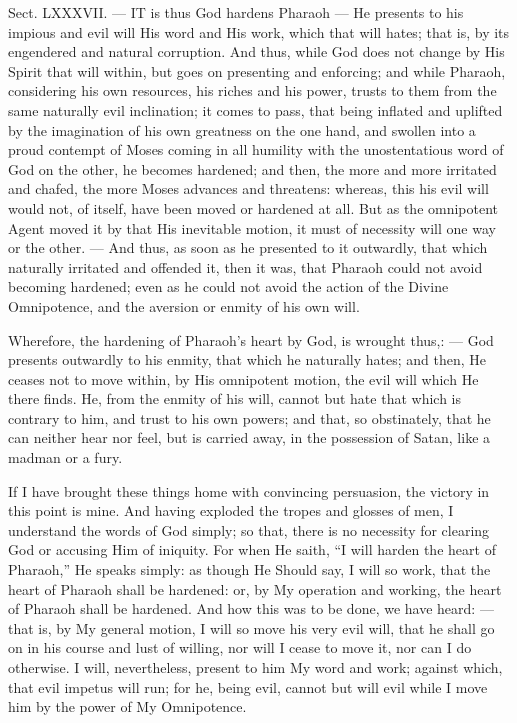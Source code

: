 
Sect. LXXXVII. — IT is thus God hardens Pharaoh — He presents to his impious and evil will His word and His work, which that will hates; that is, by its engendered and natural corruption. And thus, while God does not change by His Spirit that will within, but goes on presenting and enforcing; and while Pharaoh, considering his own resources, his riches and his power, trusts to them from the same naturally evil inclination; it comes to pass, that being inflated and uplifted by the imagination of his own greatness on the one hand, and swollen into a proud contempt of Moses coming in all humility with the unostentatious word of God on the other, he becomes hardened; and then, the more and more irritated and chafed, the more Moses advances and threatens: whereas, this his evil will would not, of itself, have been moved or hardened at all. But as the omnipotent Agent moved it by that His inevitable motion, it must of necessity will one way or the other. — And thus, as soon as he presented to it outwardly, that which naturally irritated and offended it, then it was, that Pharaoh could not avoid becoming hardened; even as he could not avoid the action of the Divine Omnipotence, and the aversion or enmity of his own will.

Wherefore, the hardening of Pharaoh’s heart by God, is wrought thus,: — God presents outwardly to his enmity, that which he naturally hates; and then, He ceases not to move within, by His omnipotent motion, the evil will which He there finds. He, from the enmity of his will, cannot but hate that which is contrary to him, and trust to his own powers; and that, so obstinately, that he can neither hear nor feel, but is carried away, in the possession of Satan, like a madman or a fury.

If I have brought these things home with convincing persuasion, the victory in this point is mine. And having exploded the tropes and glosses of men, I understand the words of God simply; so that, there is no necessity for clearing God or accusing Him of iniquity. For when He saith, “I will harden the heart of Pharaoh,” He speaks simply: as though He Should say, I will so work, that the heart of Pharaoh shall be hardened: or, by My operation and working, the heart of Pharaoh shall be hardened. And how this was to be done, we have heard: — that is, by My general motion, I will so move his very evil will, that he shall go on in his course and lust of willing, nor will I cease to move it, nor can I do otherwise. I will, nevertheless, present to him My word and work; against which, that evil impetus will run; for he, being evil, cannot but will evil while I move him by the power of My Omnipotence.

